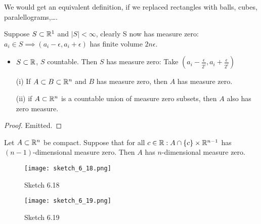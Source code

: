 \begin{remark}
    We would get an equivalent definition, if we replaced rectangles with balls, cubes, paralellograms,\dots.
\end{remark}

\begin{example}
    Suppose \(S\subset\mathbb{R}^1\) and \(|S|<\infty\), clearly S now has measure zero: \(a_i\in S\implies (a_i-\epsilon,a_i+\epsilon)\) has finite volume \(2n\epsilon\).
    \begin{itemize}
        \item \(S\subset\mathbb{R}\), \(S\) countable. Then \(S\) has measure zero: Take \((a_i-\frac{\epsilon}{2^i},a_i+\frac{\epsilon}{2^i})\)
    \end{itemize}
\end{example}

\begin{lemma}\label{lem:6.3}
    \begin{enumerate}
        \item[(i)] If \(A\subset B\subset\mathbb{R}^n\) and \(B\) has measure zero, then \(A\) has measure zero. 
        \item[(ii)] if \(A\subset\mathbb{R}^n\) is a countable union of measure zero subsets, then \(A\) also has zero measure.   
    \end{enumerate}
\end{lemma}

\begin{proof}
    Emitted.
\end{proof}

\begin{lemma}\label{lem:6.4}
    Let \(A\subset \mathbb{R}^n\) be compact. Suppose that for all \(c\in\mathbb{R}:A\cap\{c\}\times \mathbb{R}^{n-1}\)
    has \((n-1)\)-dimensional measure zero. Then \(A\) has \(n\)-dimensional measure zero. 
\end{lemma}

\begin{figure}[H]\label{fig:6.18}
    \centering
    \texttt{[image: sketch\_6\_18.png]}
    \caption{Sketch 6.18}
\end{figure}
\begin{figure}[H]\label{fig:6.19}
    \centering
    \texttt{[image: sketch\_6\_19.png]}
    \caption{Sketch 6.19}
\end{figure}

